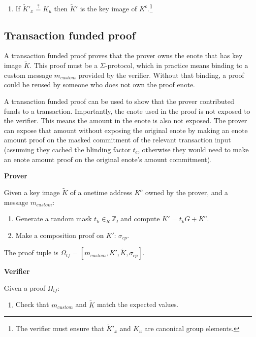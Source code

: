 \begin{appendices}
\begin{enumerate}
    \item If $\tilde{K}'_x \stackrel{?}{=} K_u$ then $\tilde{K}'$ is the key image of $K^o$.\footnote{The verifier must ensure that $\tilde{K}'_x$ and $K_u$ are canonical group elements.}
\end{enumerate}


\subsection{Transaction funded proof}
\label{appendix:jamtis-information-proofs-transaction-funded}

A transaction funded proof proves that the prover owns the enote that has key image $\tilde{K}$. This proof must be a $\Sigma$-protocol, which in practice means binding to a custom message $m_{custom}$ provided by the verifier. Without that binding, a proof could be reused by someone who does not own the proof enote.

A transaction funded proof can be used to show that the prover contributed funds to a transaction. Importantly, the enote used in the proof is not exposed to the verifier. This means the amount in the enote is also not exposed. The prover can expose that amount without exposing the original enote by making an enote amount proof on the masked commitment of the relevant transaction input (assuming they cached the blinding factor $t_c$, otherwise they would need to make an enote amount proof on the original enote's amount commitment).

\textbf{Prover}

Given a key image $\tilde{K}$ of a onetime address $K^o$ owned by the prover, and a message $m_{custom}$:

\begin{enumerate}
    \item Generate a random mask $t_k \in_R \mathbb{Z}_l$ and compute $K' = t_k G + K^o$.

    \item Make a composition proof on $K'$: $\sigma_{cp}$.
\end{enumerate}

The proof tuple is $\Omega_{tf} = [m_{custom}, K', \tilde{K}, \sigma_{cp}]$.

\textbf{Verifier}

Given a proof $\Omega_{tf}$:

\begin{enumerate}
    \item Check that $m_{custom}$ and $\tilde{K}$ match the expected values.


\end{enumerate}
\end{appendices}
